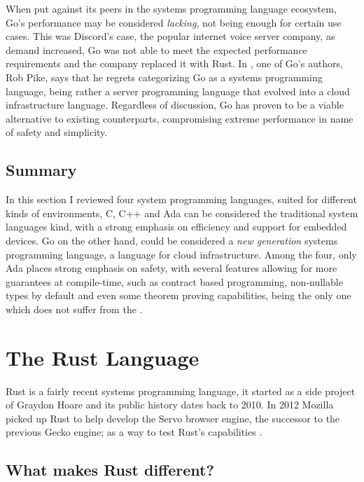 When put against its peers in the systems programming language ecosystem,
Go's performance may be considered \emph{lacking}, not being enough for certain use cases.
This was Discord's case, the popular internet voice server company, as demand increased,
Go was not able to meet the expected performance requirements and the company replaced it with Rust.
In \autocite{Torre2014}, one of Go's authors, Rob Pike, says that he regrets categorizing Go as a systems programming language,
being rather a server programming language that evolved into a cloud infrastructure language.
Regardless of discussion, Go has proven to be a viable alternative to existing counterparts,
compromising extreme performance in name of safety and simplicity.

\subsection{Summary}

In this section I reviewed four system programming languages, suited for different kinds of environments,
C, C++ and Ada can be considered the traditional system languages kind, with a strong emphasis on efficiency
and support for embedded devices.
Go on the other hand, could be considered a \emph{new generation} systems programming language, a language for cloud infrastructure.
Among the four, only Ada places strong emphasis on safety, with several features allowing for more guarantees at compile-time,
such as contract based programming, non-nullable types by default and even some theorem proving capabilities,
being the only one which does not suffer from the .

\section{The Rust Language}\label{sec:rust-lang}

Rust is a fairly recent systems programming language,
it started as a side project of Graydon Hoare and its public history dates back to 2010.
In 2012 Mozilla picked up Rust to help develop the Servo browser engine, the successor to the previous Gecko engine;
as a way to test Rust's capabilities \autocite{Klabnik2016}.

\subsection{What makes Rust different?}

